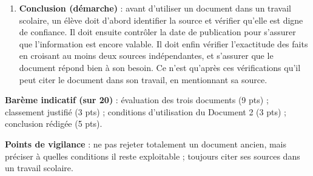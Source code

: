 \documentclass[11pt]{article}
\begin{document}
\begin{corrige}
\begin{enumerate}
\item \textbf{Conclusion (démarche)} : avant d'utiliser un document dans un travail scolaire, un élève doit d'abord identifier la source et vérifier qu'elle est digne de confiance. Il doit ensuite contrôler la date de publication pour s'assurer que l'information est encore valable. Il doit enfin vérifier l'exactitude des faits en croisant au moins deux sources indépendantes, et s'assurer que le document répond bien à son besoin. Ce n'est qu'après ces vérifications qu'il peut citer le document dans son travail, en mentionnant sa source.
\end{enumerate}
\textbf{Barème indicatif (sur 20)} : évaluation des trois documents (9 pts) ; classement justifié (3 pts) ; conditions d'utilisation du Document 2 (3 pts) ; conclusion rédigée (5 pts).

\textbf{Points de vigilance} : ne pas rejeter totalement un document ancien, mais préciser à quelles conditions il reste exploitable ; toujours citer ses sources dans un travail scolaire.
\end{corrige}
\end{document}
